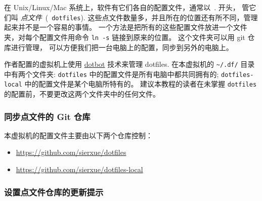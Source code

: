 \documentclass[
    11pt,
    base=hide,
    cite=authoryear,
    device=phone,
    lang=cn,
    mode=simple,
    result=answer,
    toc=onecol,
]{elegantbook_sierxue}
\begin{document}
在 Unix/Linux/Mac 系统上，软件有它们各自的配置文件，通常以~. 开头，
管它们叫 \emph{点文件}~(~\texttt{dotfiles}).
这些点文件数量多，并且所在的位置还有所不同，管理起来并不是一个容易的事情。
一个方法是把所有的这些配置文件放进一个文件夹，对每个配置文件用命令
\lstinline{ln -s} 链接到原来的位置。
这个文件夹可以用 git 仓库进行管理，
可以方便我们把一台电脑上的配置，同步到另外的电脑上。

作者配置的虚拟机上使用
\href{https://github.com/anishathalye/dotbot}{dotbot} 技术来管理 dotfiles.
在本虚拟机的 \lstinline{~/.df/} 目录中有两个文件夹: \lstinline{dotfiles}
中的配置文件是所有电脑中都共同拥有的; \lstinline{dotfiles-local}
中的配置文件是某个电脑所特有的。
建议本教程的读者在未掌握 \lstinline{dotfiles}
的配置前，不要更改这两个文件夹中的任何文件。


\subsubsection{同步点文件的 Git 仓库}%
\label{ssub:vbox-guest-ganx-conf}

本虚拟机的配置文件主要由以下两个仓库控制：
\begin{itemize}
    \item \href{https://github.com/sierxue/dotfiles}
        {https://github.com/sierxue/dotfiles}
    \item \href{https://github.com/sierxue/dotfiles-local}
        {https://github.com/sierxue/dotfiles-local}
\end{itemize}

\subsubsection{设置点文件仓库的更新提示}%
\label{ssub:vbox-guest-ganx-conf-update-notification}
\end{document}
